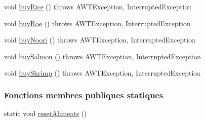 \begin{DoxyCompactItemize}
\item 
void \hyperlink{classTestSushi_1_1src_1_1Suchi_1_1Recette_aa0fc4c335f6ab3f905f63a16902a6379}{buy\+Rice} ()  throws A\+W\+T\+Exception, Interrupted\+Exception
\item 
void \hyperlink{classTestSushi_1_1src_1_1Suchi_1_1Recette_ad874ba9daf68328d6b65b09e6f16003e}{buy\+Roe} ()  throws A\+W\+T\+Exception, Interrupted\+Exception
\item 
void \hyperlink{classTestSushi_1_1src_1_1Suchi_1_1Recette_a5602befaaef8858b75c131e50f7cf91d}{buy\+Noori} ()  throws A\+W\+T\+Exception, Interrupted\+Exception
\item 
void \hyperlink{classTestSushi_1_1src_1_1Suchi_1_1Recette_a64cf6254490e04e9e8031d564a4a0ea3}{buy\+Salmon} ()  throws A\+W\+T\+Exception, Interrupted\+Exception
\item 
void \hyperlink{classTestSushi_1_1src_1_1Suchi_1_1Recette_a0d15202c729b3c6b2bb699de4137d551}{buy\+Shrimp} ()  throws A\+W\+T\+Exception, Interrupted\+Exception
\end{DoxyCompactItemize}
\subsubsection*{Fonctions membres publiques statiques}
\begin{DoxyCompactItemize}
\item 
static void \hyperlink{classTestSushi_1_1src_1_1Suchi_1_1Recette_aef7faa1aea5f8aeb869c612af16e4e62}{reset\+Aliments} ()
\end{DoxyCompactItemize}
